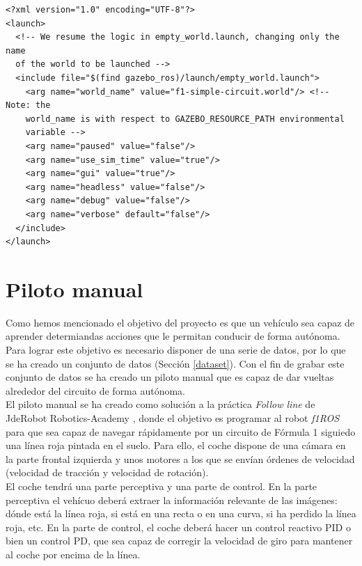 \vspace{20pt}
\begin{lstlisting}[frame=single]
<?xml version="1.0" encoding="UTF-8"?>
<launch>
  <!-- We resume the logic in empty_world.launch, changing only the name 
  of the world to be launched -->
  <include file="$(find gazebo_ros)/launch/empty_world.launch">
    <arg name="world_name" value="f1-simple-circuit.world"/> <!-- Note: the 
    world_name is with respect to GAZEBO_RESOURCE_PATH environmental
    variable -->
    <arg name="paused" value="false"/>
    <arg name="use_sim_time" value="true"/>
    <arg name="gui" value="true"/>
    <arg name="headless" value="false"/>
    <arg name="debug" value="false"/>
    <arg name="verbose" default="false"/>
  </include>  
</launch>
\end{lstlisting}


\section{Piloto manual}\label{piloto}

Como hemos mencionado el objetivo del proyecto es que un vehículo sea capaz de aprender determiandas acciones que le permitan conducir de forma autónoma. Para lograr este objetivo es necesario disponer de una serie de datos, por lo que se ha creado un conjunto de datos (Sección \ref{dataset}). Con el fin de grabar este conjunto de datos se ha creado un piloto manual que es capaz de dar vueltas alrededor del circuito de forma autónoma. \\

El piloto manual \cite{vanessa_prueba1} \cite{vanessa_prueba2} se ha creado como solución a la práctica \textit{Follow line} de JdeRobot Robotics-Academy \cite{follow_line_jderobot}, donde el objetivo es programar al robot \textit{f1ROS} para que sea capaz de navegar rápidamente por un circuito de Fórmula 1 siguiedo una línea roja pintada en el suelo. Para ello, el coche dispone de una cámara en la parte frontal izquierda y unos motores a los que se envían órdenes de velocidad (velocidad de tracción y velocidad de rotación).\\

El coche tendrá una parte perceptiva y una parte de control. En la parte perceptiva el vehícuo deberá extraer la información relevante de las imágenes: dónde está la línea roja, si está en una recta o en una curva, si ha perdido la línea roja, etc. En la parte de control, el coche deberá hacer un control reactivo PID o bien un control PD, que sea capaz de corregir la velocidad de giro para mantener al coche por encima de la línea.\\ 

